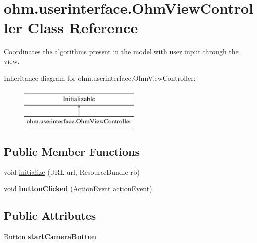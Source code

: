 \hypertarget{classohm_1_1userinterface_1_1_ohm_view_controller}{}\section{ohm.\+userinterface.\+Ohm\+View\+Controller Class Reference}
\label{classohm_1_1userinterface_1_1_ohm_view_controller}


Coordinates the algorithms present in the model with user input through the view.  


Inheritance diagram for ohm.\+userinterface.\+Ohm\+View\+Controller\+:\begin{figure}[H]
\begin{center}
\leavevmode
\includegraphics[height=2.000000cm]{classohm_1_1userinterface_1_1_ohm_view_controller}
\end{center}
\end{figure}
\subsection*{Public Member Functions}
\begin{DoxyCompactItemize}
\item 
void \hyperlink{classohm_1_1userinterface_1_1_ohm_view_controller_aa1653060f9f810ea5cd6a0f917b02521}{initialize} (U\+RL url, Resource\+Bundle rb)
\item 
\hypertarget{classohm_1_1userinterface_1_1_ohm_view_controller_ab5c13417b6bd773de779c08757988824}{}\label{classohm_1_1userinterface_1_1_ohm_view_controller_ab5c13417b6bd773de779c08757988824} 
void {\bfseries button\+Clicked} (Action\+Event action\+Event)
\end{DoxyCompactItemize}
\subsection*{Public Attributes}
\begin{DoxyCompactItemize}
\item 
\hypertarget{classohm_1_1userinterface_1_1_ohm_view_controller_a3d5fcbb87065c909362db6e2b08ac990}{}\label{classohm_1_1userinterface_1_1_ohm_view_controller_a3d5fcbb87065c909362db6e2b08ac990} 
Button {\bfseries start\+Camera\+Button}
\end{DoxyCompactItemize}


